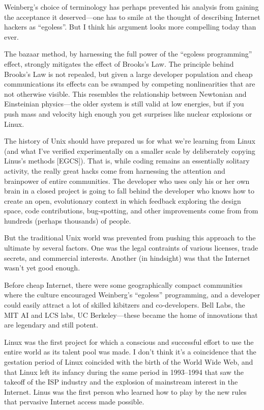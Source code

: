 \documentclass[a4paper,12pt,UTF8,twoside]{ctexbook}
\begin{document}
Weinberg's choice of terminology has perhaps prevented his analysis from gaining the acceptance it deserved—one has to smile at the thought of describing Internet hackers as ``egoless''. But I think his argument looks more compelling today than ever.

The bazaar method, by harnessing the full power of the ``egoless programming'' effect, strongly mitigates the effect of Brooks's Law. The principle behind Brooks's Law is not repealed, but given a large developer population and cheap communications its effects can be swamped by competing nonlinearities that are not otherwise visible. This resembles the relationship between Newtonian and Einsteinian physics—the older system is still valid at low energies, but if you push mass and velocity high enough you get surprises like nuclear explosions or Linux.

The history of Unix should have prepared us for what we're learning from Linux (and what I've verified experimentally on a smaller scale by deliberately copying Linus's methods [EGCS]). That is, while coding remains an essentially solitary activity, the really great hacks come from harnessing the attention and brainpower of entire communities. The developer who uses only his or her own brain in a closed project is going to fall behind the developer who knows how to create an open, evolutionary context in which feedback exploring the design space, code contributions, bug-spotting, and other improvements come from from hundreds (perhaps thousands) of people.

But the traditional Unix world was prevented from pushing this approach to the ultimate by several factors. One was the legal contraints of various licenses, trade secrets, and commercial interests. Another (in hindsight) was that the Internet wasn't yet good enough.

Before cheap Internet, there were some geographically compact communities where the culture encouraged Weinberg's ``egoless'' programming, and a developer could easily attract a lot of skilled kibitzers and co-developers. Bell Labs, the MIT AI and LCS labs, UC Berkeley—these became the home of innovations that are legendary and still potent.

Linux was the first project for which a conscious and successful effort to use the entire world as its talent pool was made. I don't think it's a coincidence that the gestation period of Linux coincided with the birth of the World Wide Web, and that Linux left its infancy during the same period in 1993–1994 that saw the takeoff of the ISP industry and the explosion of mainstream interest in the Internet. Linus was the first person who learned how to play by the new rules that pervasive Internet access made possible.
\end{document}
